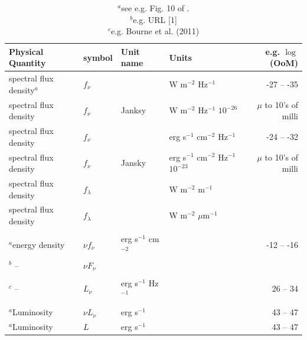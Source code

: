 \documentclass[11pt,a4paper]{article}
\begin{document}
\begin{table}
  \begin{center}
    \setlength{\tabcolsep}{4pt}
    \begin{tabular}{llllr}
      \hline
      \hline
      Physical Quantity & symbol & Unit name & Units & e.g. $\log$(OoM)   \\
      \hline
      spectral flux density$^{a}$ &  $f_{\nu}$        &             & W                  m$^{-2}$ Hz$^{-1}$                      & -27 -- -35 \\
      spectral flux density          &  $f_{\nu}$        & Janksy  & W                   m$^{-2}$ Hz$^{-1}$  $10^{-26}$   & $\mu$ to 10's of milli \\
      spectral flux density          &  $f_{\nu}$        &             & erg s$^{-1}$ cm$^{-2}$ Hz$^{-1}$                      & -24 -- -32 \\
      spectral flux density          &  $f_{\nu}$        & Jansky  & erg s$^{-1}$ cm$^{-2}$ Hz$^{-1}$  $10^{-23}$   & $\mu$ to 10's of milli \\
      spectral flux density          &  $f_{\lambda}$  &             &  W                  m$^{-2}$ m$^{-1}$                       &  \\
      spectral flux density          &  $f_{\lambda}$  &             &  W                  m$^{-2}$ $\mu$m$^{-1}$             &  \\
                                                &                       &             &                        & \\
      $^{a}$energy density         & $\nu f_{\nu}$   &  erg s$^{-1}$ cm$^{-2}$       &        & -12 -- -16 \\
     $^{b}$ --                            & $\nu F_{\nu}$ &                                            &        &      \\
                                                &                       &             &                        & \\
     $^{c}$ --                            &        $L_{\nu}$ &  erg s$^{-1}$ Hz$^{-1}$       &        &    26 -- 34  \\
                                                &                       &             &                        & \\

     $^{a}$Luminosity              &  $\nu L_{\nu}$ &  erg s$^{-1}$                        &       &   43 -- 47 \\
     $^{a}$Luminosity              &  $L$ &  erg s$^{-1}$                        &       &   43 -- 47 \\
      \hline
      \hline
   \end{tabular}
    \caption{$^{a}$see e.g. Fig. 10 of \citet{Richards06b}.\\
      $^{b}$e.g. URL [1]\\
      $^{c}$e.g. Bourne et al. (2011)
}
     \label{tab:units_overview}
  \end{center}
\end{table}
\end{document}
